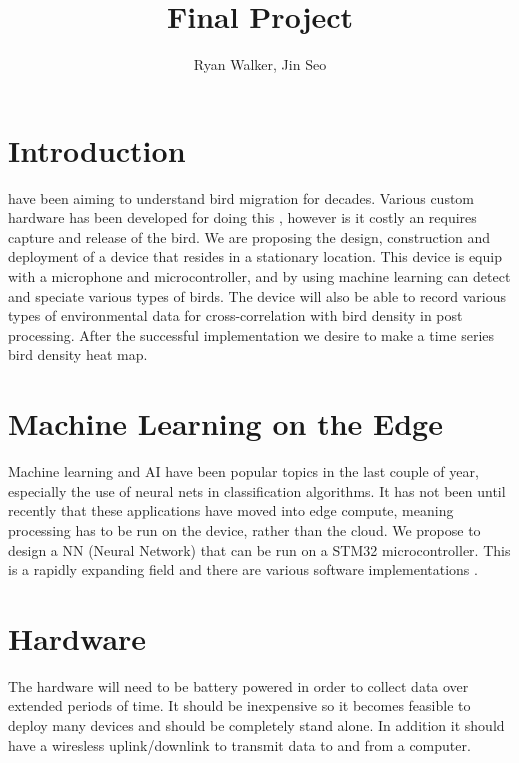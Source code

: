 \documentclass[12pt,journal,compsoc]{IEEEtran}
\begin{document}
\title{Final Project}

\author{Ryan Walker, Jin Seo}

\IEEEtitleabstractindextext{%
}

\maketitle
\IEEEpeerreviewmaketitle

\section{Introduction}
 have been aiming to understand bird migration for decades. Various custom hardware has been developed for doing this \cite{BirdTracking}, however is it costly an requires capture and release of the bird. We are proposing the design, construction and deployment of a device that resides in a stationary location. This device is equip with a microphone and microcontroller, and by using machine learning \cite{ML1} \cite{ML2} can detect and speciate various types of birds. The device will also be able to record various types of environmental data for cross-correlation with bird density in post processing. After the successful implementation we desire to make a time series bird density heat map.

\section{Machine Learning on the Edge}
Machine learning and AI have been popular topics in the last couple of year, especially the use of neural nets in classification algorithms. It has not been until recently that these applications have moved into edge compute, meaning processing has to be run on the device, rather than the cloud. We propose to design a NN (Neural Network) that can be run on a STM32 microcontroller. This is a rapidly expanding field and there are various software implementations \cite{CMSIS}. 

\section{Hardware}
The hardware will need to be battery powered in order to collect data over extended periods of time. It should be inexpensive so it becomes feasible to deploy many devices and should be completely stand alone. In addition it should have a wiresless uplink/downlink to transmit data to and from a computer.
\end{document}
